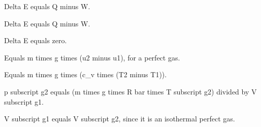Delta E equals Q minus W.

Delta E equals Q minus W.

Delta E equals zero.

Equals m times g times (u2 minus u1), for a perfect gas.

Equals m times g times (c_v times (T2 minus T1)).

p subscript g2 equals (m times g times R bar times T subscript g2) divided by V subscript g1.

V subscript g1 equals V subscript g2, since it is an isothermal perfect gas.
